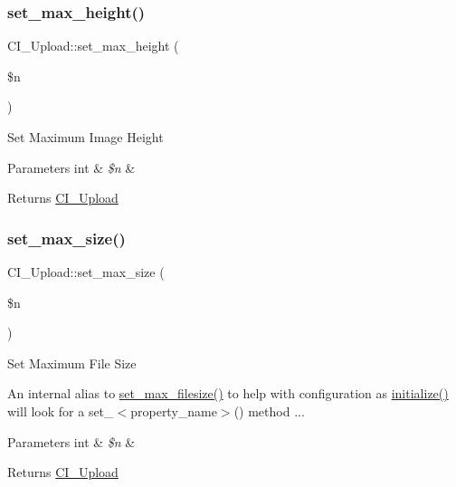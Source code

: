 \subsubsection{\texorpdfstring{set\+\_\+max\+\_\+height()}{set\_max\_height()}}
{\footnotesize\ttfamily C\+I\+\_\+\+Upload\+::set\+\_\+max\+\_\+height (\begin{DoxyParamCaption}\item[{}]{\$n }\end{DoxyParamCaption})}

Set Maximum Image Height


\begin{DoxyParams}[1]{Parameters}
int & {\em \$n} & \\
\hline
\end{DoxyParams}
\begin{DoxyReturn}{Returns}
\mbox{\hyperlink{class_c_i___upload}{C\+I\+\_\+\+Upload}} 
\end{DoxyReturn}
\mbox{\label{class_c_i___upload_afb4d99be805b31bb404905c09b14f158}} 
\subsubsection{\texorpdfstring{set\+\_\+max\+\_\+size()}{set\_max\_size()}}
{\footnotesize\ttfamily C\+I\+\_\+\+Upload\+::set\+\_\+max\+\_\+size (\begin{DoxyParamCaption}\item[{}]{\$n }\end{DoxyParamCaption})\hspace{0.3cm}{\ttfamily [protected]}}

Set Maximum File Size

An internal alias to \mbox{\hyperlink{class_c_i___upload_a39c5a916b1ae99355bccaf4db056a30e}{set\+\_\+max\+\_\+filesize()}} to help with configuration as \mbox{\hyperlink{class_c_i___upload_a4aaf1074d6383b0ad00cf52bd44cdb6f}{initialize()}} will look for a set\+\_\+$<$property\+\_\+name$>$() method ...


\begin{DoxyParams}[1]{Parameters}
int & {\em \$n} & \\
\hline
\end{DoxyParams}
\begin{DoxyReturn}{Returns}
\mbox{\hyperlink{class_c_i___upload}{C\+I\+\_\+\+Upload}} 
\end{DoxyReturn}
\mbox{\label{class_c_i___upload_a6c02c4329b368eaac0c6719c3cb910df}} 
